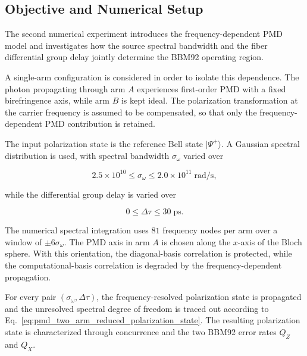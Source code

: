 
\subsection{Objective and Numerical Setup}

The second numerical experiment introduces the frequency-dependent PMD model and
investigates how the source spectral bandwidth and the fiber differential group
delay jointly determine the BBM92 operating region.

A single-arm configuration is considered in order to isolate this dependence.
The photon propagating through arm \(A\) experiences first-order PMD with a fixed
birefringence axis, while arm \(B\) is kept ideal. The polarization
transformation at the carrier frequency is assumed to be compensated, so that
only the frequency-dependent PMD contribution is retained.

The input polarization state is the reference Bell state \( |\Psi^+\rangle \).
A Gaussian spectral distribution is used, with spectral bandwidth
\(\sigma_\omega\) varied over

\begin{equation}
2.5\times10^{10}
\leq
\sigma_\omega
\leq
2.0\times10^{11}
\;\mathrm{rad/s},
\end{equation}

while the differential group delay is varied over

\begin{equation}
0
\leq
\Delta\tau
\leq
30
\;\mathrm{ps}.
\end{equation}

The numerical spectral integration uses \(81\) frequency nodes per arm over a
window of \(\pm6\sigma_\omega\). The PMD axis in arm \(A\) is chosen along the
\(x\)-axis of the Bloch sphere. With this orientation, the diagonal-basis
correlation is protected, while the computational-basis correlation is degraded
by the frequency-dependent propagation.

For every pair \((\sigma_\omega,\Delta\tau)\), the frequency-resolved
polarization state is propagated and the unresolved spectral degree of freedom
is traced out according to
Eq.~\eqref{eq:pmd_two_arm_reduced_polarization_state}. The resulting polarization
state is characterized through concurrence and the two BBM92 error rates
\(Q_Z\) and \(Q_X\).

